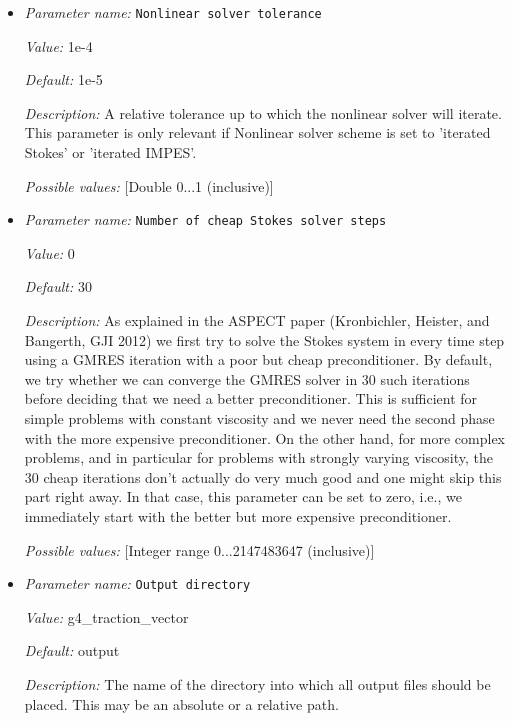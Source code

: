 \begin{itemize}
{\it Possible values:} [Selection IMPES|iterated IMPES|iterated Stokes|Stokes only|Advection only ]
\item {\it Parameter name:} {\tt Nonlinear solver tolerance}
\label{parameters:Nonlinear solver tolerance}


{\it Value:} 1e-4


{\it Default:} 1e-5


{\it Description:} A relative tolerance up to which the nonlinear solver will iterate. This parameter is only relevant if Nonlinear solver scheme is set to 'iterated Stokes' or 'iterated IMPES'.


{\it Possible values:} [Double 0...1 (inclusive)]
\item {\it Parameter name:} {\tt Number of cheap Stokes solver steps}
\label{parameters:Number of cheap Stokes solver steps}


{\it Value:} 0


{\it Default:} 30


{\it Description:} As explained in the ASPECT paper (Kronbichler, Heister, and Bangerth, GJI 2012) we first try to solve the Stokes system in every time step using a GMRES iteration with a poor but cheap preconditioner. By default, we try whether we can converge the GMRES solver in 30 such iterations before deciding that we need a better preconditioner. This is sufficient for simple problems with constant viscosity and we never need the second phase with the more expensive preconditioner. On the other hand, for more complex problems, and in particular for problems with strongly varying viscosity, the 30 cheap iterations don't actually do very much good and one might skip this part right away. In that case, this parameter can be set to zero, i.e., we immediately start with the better but more expensive preconditioner.


{\it Possible values:} [Integer range 0...2147483647 (inclusive)]
\item {\it Parameter name:} {\tt Output directory}
\label{parameters:Output directory}


{\it Value:} g4_traction_vector


{\it Default:} output


{\it Description:} The name of the directory into which all output files should be placed. This may be an absolute or a relative path.



\end{itemize}
